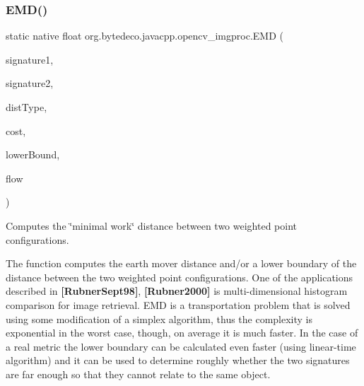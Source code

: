 \subsubsection{\texorpdfstring{E\+M\+D()}{EMD()}}
{\footnotesize\ttfamily static native float org.\+bytedeco.\+javacpp.\+opencv\+\_\+imgproc.\+E\+MD (\begin{DoxyParamCaption}\item[{@By\+Val Mat}]{signature1,  }\item[{@By\+Val Mat}]{signature2,  }\item[{int}]{dist\+Type,  }\item[{@By\+Val(null\+Value=\char`\"{}cv\+::\+Input\+Array(cv\+::no\+Array())\char`\"{}) Mat}]{cost,  }\item[{Float\+Pointer}]{lower\+Bound,  }\item[{@By\+Val(null\+Value=\char`\"{}cv\+::\+Output\+Array(cv\+::no\+Array())\char`\"{}) Mat}]{flow }\end{DoxyParamCaption})\hspace{0.3cm}{\ttfamily [static]}}



Computes the \char`\"{}minimal work\char`\"{} distance between two weighted point configurations. 

The function computes the earth mover distance and/or a lower boundary of the distance between the two weighted point configurations. One of the applications described in {\bfseries [Rubner\+Sept98]}, {\bfseries [Rubner2000]} is multi-\/dimensional histogram comparison for image retrieval. E\+MD is a transportation problem that is solved using some modification of a simplex algorithm, thus the complexity is exponential in the worst case, though, on average it is much faster. In the case of a real metric the lower boundary can be calculated even faster (using linear-\/time algorithm) and it can be used to determine roughly whether the two signatures are far enough so that they cannot relate to the same object. 


